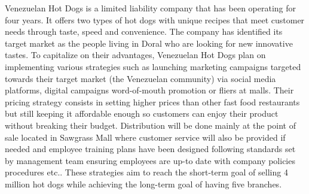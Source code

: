 

Venezuelan Hot Dogs is a limited liability company that has been operating for four years. It offers two types of hot dogs with unique recipes that meet customer needs through taste, speed and convenience. The company has identified its target market as the people living in Doral who are looking for new innovative tastes. To capitalize on their advantages, Venezuelan Hot Dogs plan on implementing various strategies such as launching marketing campaigns targeted towards their target market (the Venezuelan community) via social media platforms, digital campaigns word-of-mouth promotion or fliers at malls. Their pricing strategy consists in setting higher prices than other fast food restaurants but still keeping it affordable enough so customers can enjoy their product without breaking their budget. Distribution will be done mainly at the point of sale located in Sawgrass Mall where customer service will also be provided if needed and employee training plans have been designed following standards set by management team ensuring employees are up-to date with company policies procedures etc.. These strategies aim to reach the short-term goal of selling 4 million hot dogs while achieving the long-term goal of having five branches. 